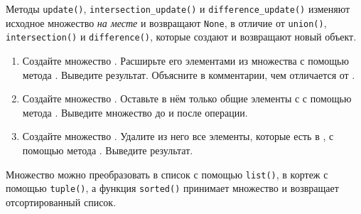 \documentclass[a4,12pt]{article}
\theoremstyle{remark}
\begin{document}
\begin{exercisecomment}[title=Раздел 5. Обновление множеств на месте]
Методы \texttt{update()}, \texttt{intersection\_update()} и \texttt{difference\_update()} изменяют
исходное множество \emph{на месте} и возвращают \texttt{None}, в отличие от \texttt{union()},
\texttt{intersection()} и \texttt{difference()}, которые создают и возвращают новый объект.
\end{exercisecomment}

\begin{enumerate}[resume]

    \item Создайте множество {}. Расширьте его элементами из множества {} с помощью метода {}. Выведите результат. Объясните в комментарии, чем {} отличается от {}.

    \item Создайте множество {}. Оставьте в нём только общие элементы с {} с помощью метода {}. Выведите множество до и после операции.

    \item Создайте множество {}. Удалите из него все элементы, которые есть в {}, с помощью метода {}. Выведите результат.

\end{enumerate}

\begin{exercisecomment}[title=Раздел 6. Преобразование типов]
Множество можно преобразовать в список с помощью \texttt{list()}, в кортеж с помощью \texttt{tuple()},
а функция \texttt{sorted()} принимает множество и возвращает отсортированный список.
\end{exercisecomment}
\end{document}

